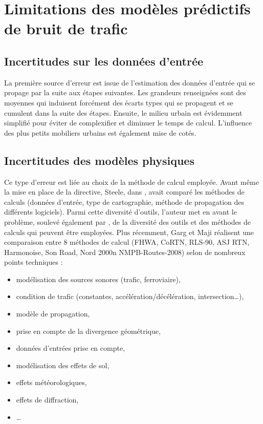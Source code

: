 \section{Limitations des modèles prédictifs de bruit de trafic}

\subsection{Incertitudes sur les données d'entrée}

La première source d'erreur est issue de l'estimation des données d'entrée qui se propage par la suite aux étapes suivantes. 
Les grandeurs renseignées sont des moyennes qui induisent forcément des écarts types qui se propagent et se cumulent dans la suite des étapes. Ensuite, le milieu urbain est évidemment simplifié pour éviter de complexifier et diminuer le temps de calcul. L'influence des plus petits mobiliers urbains est également mise de cotés.
 

\subsection{Incertitudes des modèles physiques}

Ce type d'erreur est liée au choix de la méthode de calcul employée. Avant même la mise en place de la directive, Steele, dans \cite{steele_critical_2001}, avait comparé les méthodes de calculs (données d'entrée, type de cartographie, méthode de propagation des différents logiciels). Parmi cette diversité d'outils, l'auteur met en avant le problème, soulevé également par \cite{king_implementation_2011}, de la diversité des outils et des méthodes de calculs qui peuvent être employées. Plus récemment, Garg et Maji \cite{garg_critical_2014} réalisent une comparaison entre 8 méthodes de calcul (FHWA, CoRTN, RLS-90, ASJ RTN, Harmonoise, Son Road, Nord 2000n NMPB-Routes-2008) selon de nombreux points techniques : 

\begin{itemize}
\item modélisation des sources sonores (trafic, ferroviaire), 
\item condition de trafic (constantes, accélération/décélération, intersection\dots), 
\item modèle de propagation, 
\item prise en compte de la divergence géométrique, 
\item données d'entrées prise en compte, 
\item modélisation des effets de sol,
\item effets météorologiques,
\item effets de diffraction,
\item \dots  \\
\end{itemize}

